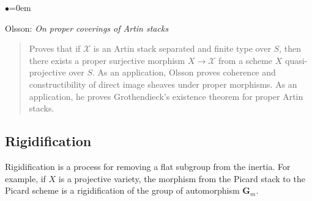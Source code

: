\begin{list}{$\bullet$}{\leftmargin=0em}
\item Olsson: \emph{On proper coverings of Artin stacks} \cite{olsson_proper}
\begin{quote}
Proves that if $\mathcal{X}$ is an Artin stack separated
and finite type over $S$, then 
there exists a proper surjective morphism $X \to \mathcal{X}$ from a scheme $X$ 
quasi-projective over $S$. As an application, Olsson proves coherence and 
constructibility of direct image sheaves under proper morphisms. As an
application, he proves Grothendieck's existence theorem for proper
Artin stacks. 
\end{quote}
\end{list}


\subsection{Rigidification}
\label{subsection-rigidification}

\noindent
Rigidification is a process for removing a flat subgroup from the inertia.
For example, if $X$ is a projective variety, the morphism from the Picard
stack to the Picard scheme is a rigidification of the group of automorphism
$\mathbf{G}_m$.  

\smallskip

